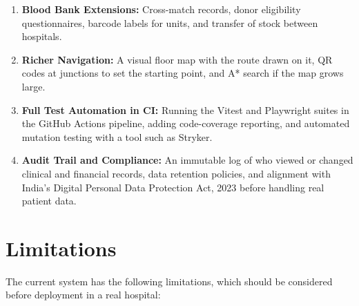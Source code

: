 \begin{enumerate}
    \item \textbf{Blood Bank Extensions:} Cross-match records, donor eligibility questionnaires, barcode labels for units, and transfer of stock between hospitals.

    \item \textbf{Richer Navigation:} A visual floor map with the route drawn on it, QR codes at junctions to set the starting point, and A* search if the map grows large.

    \item \textbf{Full Test Automation in CI:} Running the Vitest and Playwright suites in the GitHub Actions pipeline, adding code-coverage reporting, and automated mutation testing with a tool such as Stryker.

    \item \textbf{Audit Trail and Compliance:} An immutable log of who viewed or changed clinical and financial records, data retention policies, and alignment with India's Digital Personal Data Protection Act, 2023 before handling real patient data.
\end{enumerate}

\section{Limitations}

The current system has the following limitations, which should be considered before deployment in a real hospital:

